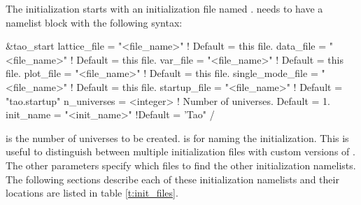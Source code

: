 The initialization starts with an initialization file named
.   needs to have a  namelist
block with the following syntax:
\begin{example}
  &tao_start
    lattice_file      = "<file_name>"  ! Default = this file.
    data_file         = "<file_name>"  ! Default = this file.
    var_file          = "<file_name>"  ! Default = this file.
    plot_file         = "<file_name>"  ! Default = this file.
    single_mode_file  = "<file_name>"  ! Default = this file.
    startup_file      = "<file_name>"  ! Default = "tao.startup"
    n_universes       = <integer>            ! Number of universes. Default = 1.
    init_name      = "<init_name>" !Default = 'Tao"
  /
\end{example}
 is the number of universes to be created.   is
for naming the initialization. This is useful to distinguish between multiple
initialization files with custom versions of \tao.  The other parameters specify
which files to find the other initialization namelists. The following sections
describe each of these initialization namelists and their locations are listed
in table \ref{t:init_files}.

